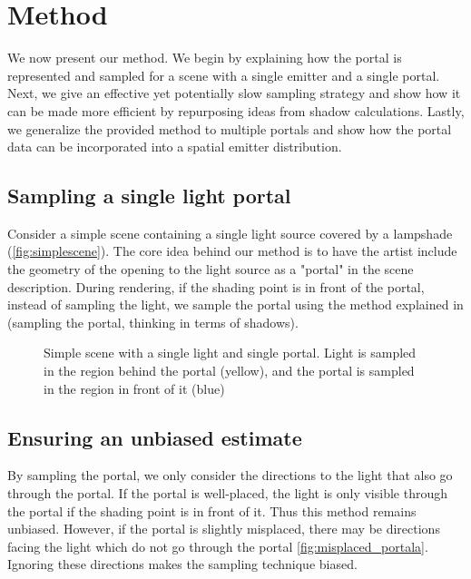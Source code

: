 \section{Method}
\label{sec:method}

We now present our method. We begin by explaining how the portal is represented and sampled for a scene with a single emitter and a single portal. Next, we give an effective yet potentially slow sampling strategy and show how it can be made more efficient by repurposing ideas from shadow calculations. Lastly, we generalize the provided method to multiple portals and show how the portal data can be incorporated into a spatial emitter distribution.

\subsection{Sampling a single light portal}

Consider a simple scene containing a single light source covered by a lampshade (\autoref{fig:simplescene}). The core idea behind our method is to have the artist include the geometry of the opening to the light source as a "portal" in the scene description. During rendering, if the shading point is in front of the portal, instead of sampling the light, we sample the portal using the method explained in (sampling the portal, thinking in terms of shadows).

\begin{figure}[H]
  \centering
  \def\svgwidth{0.4\columnwidth}
  
  \caption{Simple scene with a single light and single portal. Light is sampled in the region behind the portal (yellow), and the  portal is sampled in the region in front of it (blue)}
  \label{fig:simplescene}
\end{figure}

\subsection{Ensuring an unbiased estimate}
\label{sec:maintain_unbiased}

By sampling the portal, we only consider the directions to the light that also go through the portal. If the portal is well-placed, the light is only visible through the portal if the shading point is in front of it. Thus this method remains unbiased. However, if the portal is slightly misplaced, there may be directions facing the light which do not go through the portal \autoref{fig:misplaced_portala}. Ignoring these directions makes the sampling technique biased.

